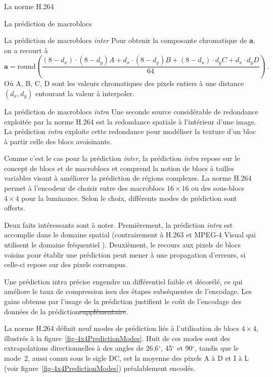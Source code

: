 \documentclass[letterpaper, twoside, 12pt,memoire]{thETS}
\newcommand{\fig}[1]{figure~\ref{#1}}
\providecommand{\DIFadd}[1]{{\protect\color{blue}\uwave{#1}}} %
\providecommand{\DIFdel}[1]{{\protect\color{red}\sout{#1}}}                      %
\providecommand{\DIFaddbegin}{} %
\providecommand{\DIFaddend}{} %
\providecommand{\DIFdelbegin}{} %
\providecommand{\DIFdelend}{} %
\begin{document}
\begin{chapter}{La norme H.264}
\begin{section}{La prédiction de macroblocs}
\begin{subsection}{La prédiction de macroblocs \textit{inter}}
Pour obtenir la composante chromatique de $\mathbf{a}$, on a recourt à
{\small\begin{equation}
\mathbf{a} = \text{round} \left( \frac{(8 - d_x) \cdot (8-d_y)A + d_x \cdot (8 -
d_y)B + (8 - d_x) \cdot d_yC + d_x \cdot d_yD}{64} \right)\:.
\end{equation}}
Où A, B, C, D sont les valeurs chromatiques des pixels entiers à une distance
$(d_x,d_y)$ entourant la valeur à interpoler.
\end{subsection}

\begin{subsection}{La prédiction de macroblocs \textit{intra}}
Une seconde source considérable de redondance exploitée par la norme H.264 est
la redondance spatiale à l'intérieur d'une image. La prédiction \textit{intra}
exploite cette redondance pour modéliser la texture d'un bloc à partir celle des
blocs avoisinants.

Comme c'est le cas pour la prédiction \textit{inter}, la prédiction
\textit{intra} repose sur le concept de blocs et de macroblocs et comprend la
notion de blocs à tailles variables visant à améliorer la prédiction de régions
complexes. La norme H.264 permet à l'encodeur de choisir entre des macroblocs
$16 \times 16$ ou des sous-blocs $4 \times 4$ pour la luminance. Selon le choix,
différents modes de prédiction sont offerts.

Deux faits intéressants sont à noter. Premièrement, la prédiction \textit{intra}
est accomplie dans le domaine spatial (contrairement à H.263 et MPEG-4 Visual
qui utilisent le domaine fréquentiel \citep{wiegand2003}). Deuxièment, le
recours aux pixels de blocs voisins pour établir une prédiction peut mener à une
propagation d'erreurs, si celle-ci repose sur des pixels corrompus.

Une prédiction intra précise engendre un différentiel faible et
décorélé, ce qui améliore le taux de compression issu des étapes subséquentes
de l'encodage. Les gains obtenus par l'usage de la prédiction justifient le coût
\DIFaddbegin \DIFadd{supplémentaire }\DIFaddend de l'encodage des données de la prédiction\DIFdelbegin \DIFdel{supplémentaire}\DIFdelend .


La norme H.264 définit neuf modes de prédiction liés à l'utilisation de blocs
$ 4 \times 4$, illustrés à la \fig{fig-4x4PredictionModes}. Huit de ces modes
sont des extrapolations directionnelles à des angles de 26.6$^\circ$, 45$^\circ$
et 90$^\circ$, tandis que le mode~2, aussi connu sous le sigle DC, est la
moyenne des pixels A à D et I à L (voir figure~\ref{fig-4x4PredictionModes})
préalablement encodés.


\end{subsection}
\end{section}
\end{chapter}
\end{document}
